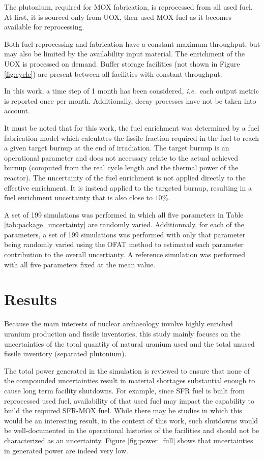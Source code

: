 \documentclass{anstrans}
\newcommand{\ie}{\emph{i.e.\ }}
\begin{document}
The plutonium, required for \gls{MOX} fabrication, is reprocessed from all used
fuel.  At first, it is sourced only from \gls{UOX}, then used \gls{MOX} fuel as
it becomes available for reprocessing.

Both fuel reprocessing and fabrication have a constant maximum throughput, but
may also be limited by the availability input material.  The enrichment of the
\gls{UOX} is processed on demand.  Buffer storage facilities (not shown in
Figure \ref{fig:cycle}) are present between all facilities with constant
throughput.

In this work, a time step of 1 month has been considered, \ie each output metric
is reported once per month. Additionally, decay processes have not be taken into
account.  

It must be noted that for this work, the fuel enrichment was determined by a
fuel fabrication model\cite{Leniau2015125} which calculates the fissile fraction
required in the fuel to reach a given target burnup at the end of irradiation.
The target burnup is an operational parameter and does not necessary relate to
the actual achieved burnup (computed from the real cycle length and the thermal
power of the reactor). The uncertainty of the fuel enrichment is not applied
directly to the effective enrichment. It is instead applied to the targeted
burnup, resulting in a fuel enrichment uncertainty that is also close to $10\%$.


A set of 199 simulations was performed in which all five parameters in Table
\ref{tab:package_uncertainty} are randomly varied. Additionnaly, for each of the
parameters, a set of 199 simulations was performed with only that parameter
being randomly varied using the \gls{OFAT} method to estimated each parameter
contribution to the overall uncertianty.  A reference simulation was performed
with all five parameters fixed at the mean value.

\section{Results}

Because the main interests of nuclear archaeology involve highly enriched
uranium production and fissile inventories, this study mainly focuses on the
uncertainties of the total quantity of natural uranium used and the total unused
fissile inventory (separated plutonium).

The total power generated in the simulation is reviewed to ensure that none of
the compounded uncertainties result in material shortages substantial enough to
cause long term facility shutdowns.  For example, since \gls{SFR} fuel is built
from reprocessed used fuel, availability of that used fuel may impact the
capability to build the required \gls{SFR}-\gls{MOX} fuel.  While there may be
studies in which this would be an interesting result, in the context of this
work, such shutdowns would be well-documented in the operational histories of
the facilities and should not be characterized as an uncertainty.  Figure
\ref{fig:power_full} shows that uncertainties in generated power are indeed very
low.
\end{document}
